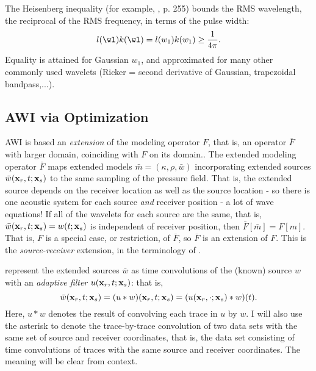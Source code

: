 The Heisenberg inequality (for example, \cite{Folland:07}, p. 255) bounds the RMS
wavelength, the reciprocal of the RMS frequency, in terms of the pulse
width:
\begin{equation}
  \label{eqn:heis}
  l(\wl) k(\wl) = l(w_1)k(w_1) \ge \frac{1}{4\pi}.
\end{equation}
Equality is attained for Gaussian $w_1$, and approximated for many other
commonly used wavelets (Ricker = second derivative of Gaussian,
trapezoidal bandpass,...).

\subsection{AWI via Optimization}

AWI is based an {\em extension} of the modeling operator $F$, that is,
an operator ${\bar F}$ with larger domain, coinciding with $F$ on its domain..
The extended modeling operator ${\bar F}$ maps extended models
$\bar{m}=(\kappa,\rho,\bar{w})$ incorporating extended sources
$\bar{w}({\bf x}_r,t;{\bf x}_s)$ to the same sampling of the pressure
field. That is, the extended source depends on the receiver location
as well as the source location - so there is one acoustic system for
each source {\em and} receiver position - a lot of wave equations! If all
of the wavelets for each source are the same, that is, ${\bar w}({\bf
  x}_r,t;{\bf x}_s) = w(t;{\bf x}_s)$ is independent of receiver
position, then ${\bar F}[\bar{m}] = F[m]$. That is, $F$ is a special
case, or restriction, of ${\bar F}$, so ${\bar F}$ is an extension of
$F$. This is the {\em source-receiver} extension, in the terminology of \cite{HuangSymes2015SEG}.

\cite{Warner:16} represent the extended sources $\bar{w}$ as time convolutions of the
(known) source $w$ with an {\em adaptive filter} $u({\bf
  x}_r,t;{\bf x}_s)$: that is,
\[
  \bar{w}({\bf x}_r,t;{\bf x}_s) = (u * w)({\bf  x}_r,t;{\bf x}_s)
  = (u({\bf  x}_r,\cdot;{\bf x}_s)*w)(t).
\]
Here, $u*w$ denotes the result of convolving each trace in $u$ by $w$. I
will also use the asterisk to denote the trace-by-trace convolution
of two data sets with the same set of source and receiver coordinates,
that is, the data set consisting of time convolutions of traces with the same source
and receiver coordinates. The meaning will be clear from context.

